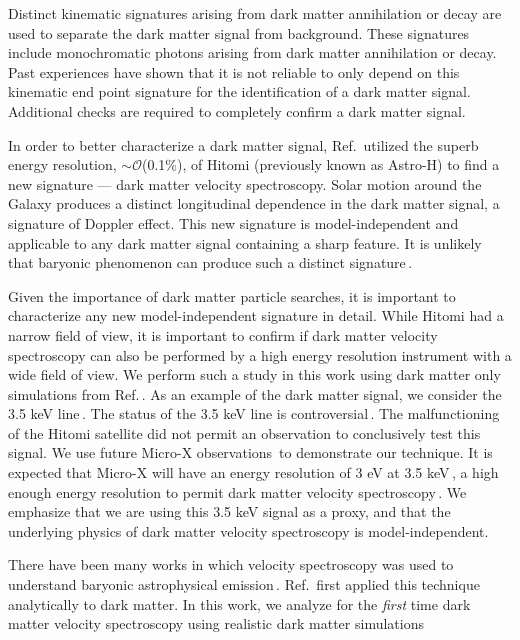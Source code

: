 \documentclass[aps,prd,10pt,twocolumn,superscriptaddress,showpacs]{revtex4-1}
\begin{document}
Distinct kinematic signatures arising from dark matter annihilation or decay are used to separate the dark matter signal from background.  These signatures include monochromatic photons arising from dark matter annihilation or decay.  Past experiences have shown that it is not reliable to only depend on this kinematic end point signature for the identification of a dark matter signal.  Additional checks are required to completely confirm a dark matter signal.  

In order to better characterize a dark matter signal, Ref.\,\cite{speckhard2016} utilized the superb energy resolution, $\sim \mathcal{O}$(0.1\%), of Hitomi (previously known as Astro-H) to find a new signature --- dark matter velocity spectroscopy.  Solar motion around the Galaxy produces a distinct longitudinal dependence in the dark matter signal, a signature of Doppler effect.  This new signature is model-independent and applicable to any dark matter signal containing a sharp feature.  It is unlikely that baryonic phenomenon can produce such a distinct signature\,\cite{speckhard2016}.

Given the importance of dark matter particle searches, it is important to characterize any new model-independent signature in detail.  While Hitomi had a narrow field of view, it is important to confirm if dark matter velocity spectroscopy can also be performed by a high energy resolution instrument with a wide field of view.  We perform such a study in this work using dark matter only simulations from Ref.\,\cite{mao2015}.  As an example of the dark matter signal, we consider the 3.5 keV line\,\cite{Bulbul:2014sua,Boyarsky:2014jta}.  The status of the 3.5 keV line is controversial\,\cite{Iakubovskyi:2015wma,Jeltema:2015mee,Ruchayskiy:2015onc,Bulbul:2016yop,Aharonian:2016gzq,Hofmann:2016urz,Arguelles:2016uwb,Conlon:2016lxl,Neronov:2016wdd,Perez:2016tcq}.  The malfunctioning of the Hitomi satellite did not permit an observation to conclusively test this signal.  We use future Micro-X observations\,\cite{Figueroa-Feliciano:2015gwa} to demonstrate our technique.  It is expected that Micro-X will have an energy resolution of 3 eV at 3.5 keV\,\cite{Figueroa-Feliciano:2015gwa}, a high enough energy resolution to permit dark matter velocity spectroscopy\,\cite{speckhard2016}.  We emphasize that we are using this 3.5 keV signal as a proxy, and that the underlying physics of dark matter velocity spectroscopy is model-independent. 

There have been many works in which velocity spectroscopy was used to understand baryonic astrophysical emission\,\cite{Dame:2000sp,Diehl:2006cf,Kalberla:2008uu,Kretschmer:2013naa}.  Ref.\,\cite{speckhard2016} first applied this technique analytically to dark matter.  In this work, we analyze for the {\it first} time dark matter velocity spectroscopy using realistic dark matter simulations 
\end{document}
